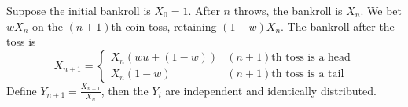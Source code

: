 Suppose the initial bankroll is \( X_0 = 1 \).
After \( n \) throws, the bankroll is \( X_n \).
We bet \( w X_n \) on the \( (n + 1) \)th coin toss, retaining \( (1-w)X_n \).
The bankroll after the toss is
\[ X_{n+1} = \begin{cases}
    X_n(wu + (1-w)) & (n + 1)\text{th toss is a head} \\
    X_n(1-w) & (n + 1)\text{th toss is a tail}
\end{cases} \]
Define \( Y_{n+1} = \frac{X_{n+1}}{X_n} \), then the \( Y_i \) are independent and identically distributed.
